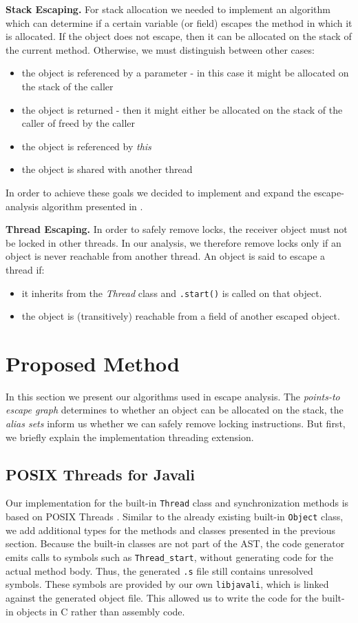 \documentclass[letterpaper]{article}
\newcommand{\mypar}[1]{{\bf #1.}}
\begin{document}
\mypar{Stack Escaping} For stack allocation we needed to implement an algorithm which can determine
if a certain variable (or field) escapes the method in which it is allocated. If the object does not
escape, then it can be allocated on the stack of the current method. Otherwise, we must distinguish between other cases:
\begin{itemize}
  \item the object is referenced by a parameter - in this case it might be allocated on the stack
  of the caller
  \item the object is returned - then it might either be allocated on the stack of the caller of freed
  by the caller
  \item the object is referenced by \textit{this}
  \item the object is shared with another thread
\end{itemize}
In order to achieve these goals we decided to implement and expand the escape-analysis algorithm presented
in \cite{Whaley:99}.

\mypar{Thread Escaping} In order to safely remove locks, the receiver object must
not be locked in other threads. In our analysis, we therefore remove locks only
if an object is never reachable from another thread. An object is said to
escape a thread if:

\begin{itemize}
  \item it inherits from the \textit{Thread} class and \texttt{.start()} is called on that object.
  \item the object is (transitively) reachable from a field of another escaped object.
\end{itemize}

\section{Proposed Method}\label{sec:yourmethod}

In this section we present our algorithms used in escape analysis.
The \emph{points-to escape graph} determines to whether an object can
be allocated on the stack, the \emph{alias sets} inform us whether we can
safely remove locking instructions. But first, we briefly explain the 
implementation threading extension.

\subsection{POSIX Threads for Javali}
Our implementation for the built-in \texttt{Thread} class and synchronization
methods is based on POSIX Threads \cite{PThreads}. Similar to the already existing built-in
\texttt{Object} class, we add additional types for the methods and
classes presented in the previous section. Because the built-in classes
are not part of the AST, the code generator emits calls to symbols such as
\texttt{Thread\_start}, without generating code for the actual method body.
Thus, the generated \texttt{.s} file still contains
unresolved symbols. These symbols are provided by our own \texttt{libjavali},
which is linked against the generated object file. This allowed us to write
the code for the built-in objects in C rather than assembly code.
\end{document}
